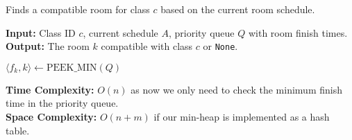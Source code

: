 \begin{Func}
    Finds a compatible room for class $c$ based on the current room schedule.

    \vspace{.5em}
    \noindent
    \textbf{Input:} Class ID $c$, current schedule $A$, priority queue $Q$ with room finish times.\\
    \textbf{Output:} The room $k$ compatible with class $c$ or \texttt{None}.\\
    \begin{algorithm}[H]
        \SetAlgoLined
        $\langle f_k, k \rangle \gets \text{PEEK\_MIN}(Q)$ 

    \end{algorithm}

    \noindent
    \textbf{Time Complexity:} $O(n)$ as now we only need to check the minimum finish time in the priority queue.\\
    \textbf{Space Complexity:} $O(n+m)$ if our min-heap is implemented as a hash table.
\end{Func}

